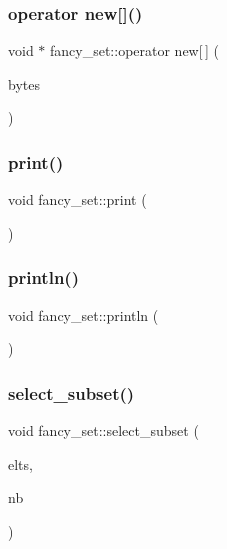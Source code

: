 \subsubsection{\texorpdfstring{operator new[]()}{operator new[]()}}
{\footnotesize\ttfamily void $\ast$ fancy\+\_\+set\+::operator new\mbox{[}$\,$\mbox{]} (\begin{DoxyParamCaption}\item[{size\+\_\+t}]{bytes }\end{DoxyParamCaption})}

\mbox{\label{classfancy__set_a0dafc0f3a78be4bc77873beafd773387}} 
\subsubsection{\texorpdfstring{print()}{print()}}
{\footnotesize\ttfamily void fancy\+\_\+set\+::print (\begin{DoxyParamCaption}{ }\end{DoxyParamCaption})}

\mbox{\label{classfancy__set_a932ecf579a3a2ab3c09a394b48cd77b9}} 
\subsubsection{\texorpdfstring{println()}{println()}}
{\footnotesize\ttfamily void fancy\+\_\+set\+::println (\begin{DoxyParamCaption}{ }\end{DoxyParamCaption})}

\mbox{\label{classfancy__set_a5178bd7eab588593d1afe900e0e9d843}} 
\subsubsection{\texorpdfstring{select\+\_\+subset()}{select\_subset()}}
{\footnotesize\ttfamily void fancy\+\_\+set\+::select\+\_\+subset (\begin{DoxyParamCaption}\item[{\mbox{\hyperlink{galois_8h_a09fddde158a3a20bd2dcadb609de11dc}{I\+NT}} $\ast$}]{elts,  }\item[{\mbox{\hyperlink{galois_8h_a09fddde158a3a20bd2dcadb609de11dc}{I\+NT}}}]{nb }\end{DoxyParamCaption})}

